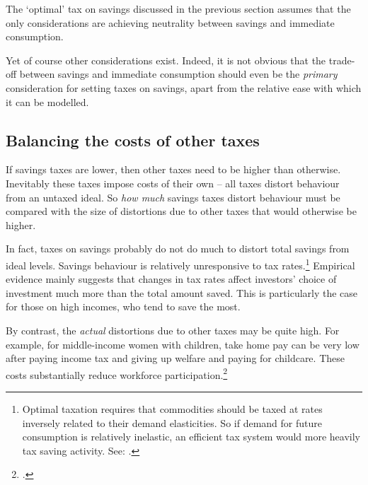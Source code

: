 The ‘optimal’ tax on savings discussed in the previous section assumes that the only considerations are achieving neutrality between savings and immediate consumption.

Yet of course other considerations exist. Indeed, it is not obvious that the trade-off between savings and immediate consumption should even be the \emph{primary} consideration for setting taxes on savings, apart from the relative ease with which it can be modelled.
\subsection{Balancing the costs of other taxes}
If savings taxes are lower, then other taxes need to be higher than otherwise. Inevitably these taxes impose costs of their own – all taxes distort behaviour from an untaxed ideal. So \emph{how much} savings taxes distort behaviour must be compared with the size of distortions due to other taxes that would otherwise be higher.

In fact, taxes on savings probably do not do much to distort total savings from ideal levels. Savings behaviour is relatively unresponsive to tax rates.\footnote{Optimal taxation requires that commodities should be taxed at rates inversely related to their demand elasticities. So if demand for future consumption is relatively inelastic, an efficient tax system would more heavily tax saving activity. See: \textcite[][21--22]{Ingles2015}.}  Empirical evidence mainly suggests that changes in tax rates affect investors’ choice of investment much more than the total amount saved. This is particularly the case for those on high incomes, who tend to save the most.

By contrast, the \emph{actual} distortions due to other taxes may be quite high. For example, for middle-income women with children, take home pay can be very low after paying income tax and giving up welfare and paying for childcare. These costs substantially reduce workforce participation.\footcite[44--47]{DaleyMcGannonGinnivan2012}


